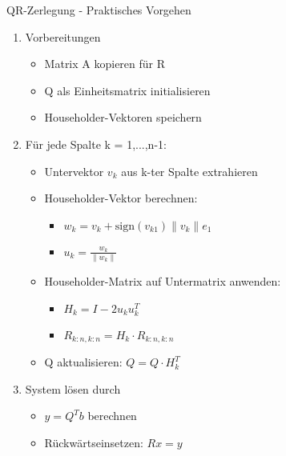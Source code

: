 \begin{KR}{QR-Zerlegung - Praktisches Vorgehen}
\begin{enumerate}
    \item Vorbereitungen
    \begin{itemize}
        \item Matrix A kopieren für R
        \item Q als Einheitsmatrix initialisieren
        \item Householder-Vektoren speichern
    \end{itemize}

    \item Für jede Spalte k = 1,...,n-1:
    \begin{itemize}
        \item Untervektor $v_k$ aus k-ter Spalte extrahieren
        \item Householder-Vektor berechnen:
            \begin{itemize}
                \item $w_k = v_k + \text{sign}(v_{k1})\|v_k\|e_1$
                \item $u_k = \frac{w_k}{\|w_k\|}$
            \end{itemize}
        \item Householder-Matrix auf Untermatrix anwenden:
            \begin{itemize}
                \item $H_k = I - 2u_ku_k^T$
                \item $R_{k:n,k:n} = H_k \cdot R_{k:n,k:n}$
            \end{itemize}
        \item Q aktualisieren: $Q = Q \cdot H_k^T$
    \end{itemize}

    \item System lösen durch
    \begin{itemize}
        \item $y = Q^Tb$ berechnen
        \item Rückwärtseinsetzen: $Rx = y$
    \end{itemize}
\end{enumerate}
\end{KR}

